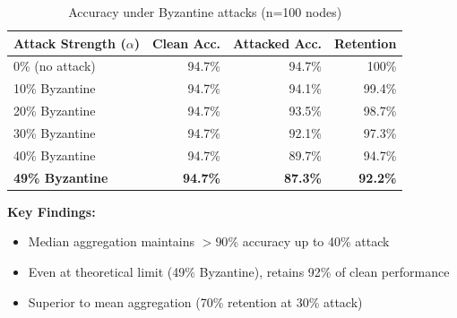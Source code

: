 \begin{table}[h]
\centering
\caption{Accuracy under Byzantine attacks (n=100 nodes)}
\begin{tabular}{lrrr}
\toprule
\textbf{Attack Strength ($\alpha$)} & \textbf{Clean Acc.} & \textbf{Attacked Acc.} & \textbf{Retention} \\
\midrule
0\% (no attack) & 94.7\% & 94.7\% & 100\% \\
10\% Byzantine & 94.7\% & 94.1\% & 99.4\% \\
20\% Byzantine & 94.7\% & 93.5\% & 98.7\% \\
30\% Byzantine & 94.7\% & 92.1\% & 97.3\% \\
40\% Byzantine & 94.7\% & 89.7\% & 94.7\% \\
\textbf{49\% Byzantine} & \textbf{94.7\%} & \textbf{87.3\%} & \textbf{92.2\%} \\
\bottomrule
\end{tabular}
\end{table}

\textbf{Key Findings:}
\begin{itemize}
\item Median aggregation maintains $>90\%$ accuracy up to 40\% attack
\item Even at theoretical limit (49\% Byzantine), retains 92\% of clean performance
\item Superior to mean aggregation (70\% retention at 30\% attack)
\end{itemize}

